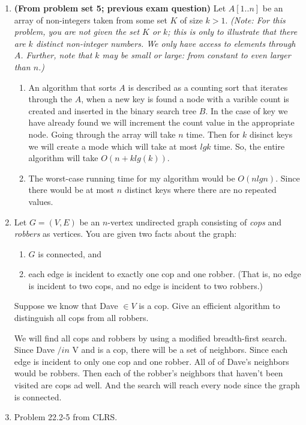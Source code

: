 \documentclass[letterpaper,11pt]{article}
\begin{document}
\begin{enumerate}

\item \textbf{(From problem set 5; previous exam question)} Let $A[1..n]$ be an array of non-integers taken from some set $K$ of size $k>1$. \emph{(Note: For this problem, you are not given the set $K$ or $k$; this is only to illustrate that there are $k$ distinct non-integer numbers. We only have access to elements through $A$. Further, note that $k$ may be small or large: from constant to even larger than $n$.)}
\begin{enumerate}
\item 
An algorithm that sorts $A$ is described as a counting sort that iterates through the $A$, when a new key is found a node with a varible count is created and inserted in the binary search tree $B$. In the case of key we have already found we will increment the count value in the appropriate node. Going through the array will take $n$ time. Then for $k$ disinct keys we will create a mode which will take at most $lg k$ time. So, the entire algorithm will take $O(n + klg(k))$. 
\item 
The worst-case running time for my algorithm would be $O(n lg n)$. Since there would be at most $n$ distinct keys where there are no repeated values.
\end{enumerate}

\item Let $G=(V,E)$ be an $n$-vertex undirected graph consisting of \emph{cops} and \emph{robbers} as vertices. You are given two facts about the graph:
\begin{enumerate}
\item $G$ is connected, and
\item each edge is incident to exactly one cop and one robber. (That is, no edge is incident to two cops, and no edge is incident to two robbers.)
\end{enumerate}
Suppose we know that Dave $\in V$ is a cop. Give an efficient algorithm to distinguish all cops from all robbers.

We will find all cops and robbers by using a modified breadth-first search. Since Dave $/in$ V and is a cop, there will be a set of neighbors. Since each edge is incident to only one cop and one robber. All of of Dave's neighbors would be robbers. Then each of the robber's neighbors that haven't been visited are cops ad well. And the search will reach every node since the graph is connected. 
\item Problem 22.2-5 from CLRS.


\end{enumerate}
\end{document}
